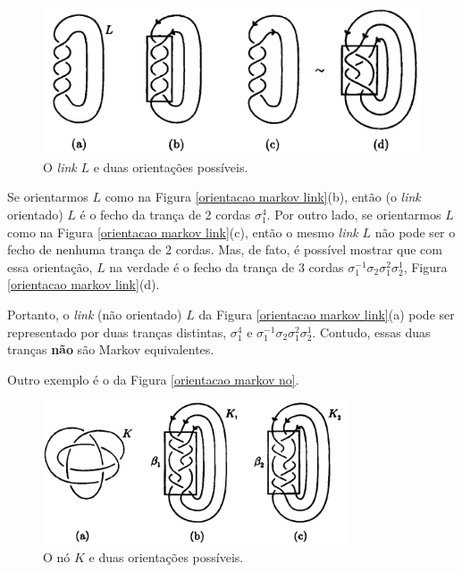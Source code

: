 \begin{remark}
		\begin{figure}[H]
			\begin{center}
				\includegraphics[width=12cm]{Images/orientacao_markov_link.png}
			\end{center}\caption{O \textit{link} $L$ e duas orientações possíveis.}\label{orientacao markov link}
		\end{figure}
		\par\vspace{0.3cm} Se orientarmos $L$ como na Figura \eqref{orientacao markov link}(b), então (o \textit{link} orientado) $L$ é o fecho da trança de 2 cordas $\sigma_1^4$. Por outro lado, se orientarmos $L$ como na Figura \eqref{orientacao markov link}(c), então o mesmo \textit{link} $L$ não pode ser o fecho de nenhuma trança de 2 cordas. Mas, de fato, é possível mostrar que com essa orientação, $L$ na verdade é o fecho da trança de 3 cordas $\sigma_1^{-1}\sigma_2\sigma_1^{2}\sigma_2^{1}$, Figura \eqref{orientacao markov link}(d).
		\par\vspace{0.3cm} Portanto, o \textit{link} (não orientado) $L$ da Figura \eqref{orientacao markov link}(a) pode ser representado por duas tranças distintas, $\sigma_1^4$ e $\sigma_1^{-1}\sigma_2\sigma_1^{2}\sigma_2^{1}$. Contudo, essas duas tranças \textbf{não} são Markov equivalentes. 
		\par\vspace{0.3cm} Outro exemplo é o da Figura \eqref{orientacao markov no}.
		
		\begin{figure}[H]
			\begin{center}
				\includegraphics[width=9cm]{Images/orientacao_markov_no.png}
			\end{center}\caption{O nó $K$ e duas orientações possíveis.}\label{orientacao markov no}
		\end{figure}
		

\end{remark}
